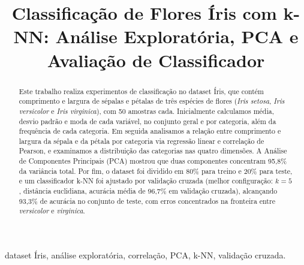 \documentclass[conference]{IEEEtran}
\begin{document}
\title{Classificação de Flores Íris com k-NN: Análise Exploratória, PCA e Avaliação de Classificador}

\author{
    \vspace{0.2cm}
}

\maketitle

\begin{abstract}
Este trabalho realiza experimentos de classificação no dataset Íris, que contém comprimento e largura de sépalas e pétalas de três espécies de flores (\textit{Iris setosa}, \textit{Iris versicolor} e \textit{Iris virginica}), com 50 amostras cada. Inicialmente calculamos média, desvio padrão e moda de cada variável, no conjunto geral e por categoria, além da frequência de cada categoria. Em seguida analisamos a relação entre comprimento e largura da sépala e da pétala por categoria via regressão linear e correlação de Pearson, e examinamos a distribuição das categorias nas quatro dimensões. A Análise de Componentes Principais (PCA) mostrou que duas componentes concentram 95,8\% da variância total. Por fim, o dataset foi dividido em 80\% para treino e 20\% para teste, e um classificador k-NN foi ajustado por validação cruzada (melhor configuração: $k=5$, distância euclidiana, acurácia média de 96,7\% em validação cruzada), alcançando 93,3\% de acurácia no conjunto de teste, com erros concentrados na fronteira entre \textit{versicolor} e \textit{virginica}.
\end{abstract}

\begin{IEEEkeywords}
dataset Íris, análise exploratória, correlação, PCA, k-NN, validação cruzada.
\end{IEEEkeywords}
\end{document}
